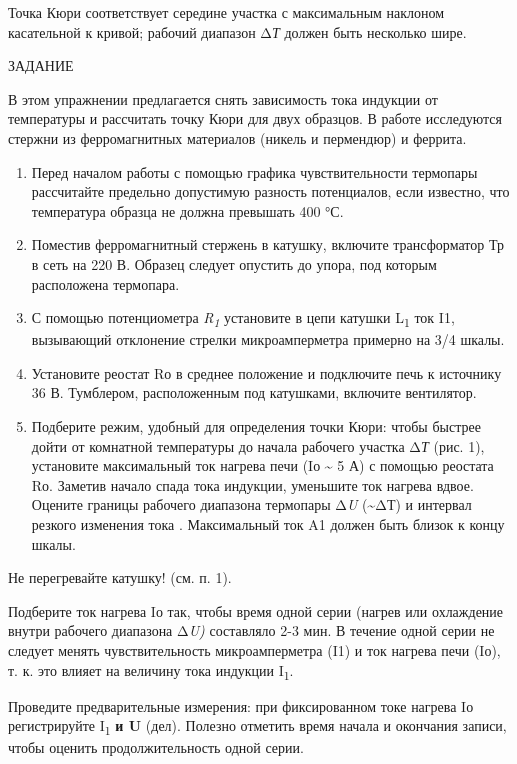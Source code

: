 \documentclass[]{article}
\begin{document}
Точка Кюри соответствует середине участка с максимальным накло­ном
касательной к кривой; рабочий диапазон Δ\emph{Т} должен быть несколь­ко
шире.

ЗАДАНИЕ

В этом упражнении предлагается снять зависимость тока индукции от
температуры и рассчитать точку Кюри для двух образцов. В работе
исследуются стержни из ферромагнитных материалов (никель и пермендюр) и
феррита.

\begin{enumerate}
\def\labelenumi{\arabic{enumi}.}
\item
  Перед началом работы с помощью графика чувствительности термо­пары
  рассчитайте предельно допустимую разность потенциалов, если известно,
  что температура образца не должна превышать 400 °С.
\item
  Поместив ферромагнитный стержень в катушку, включите трансфор­матор Тр
  в сеть на 220 В. Образец следует опустить до упора, под которым
  расположена термопара.
\item
  С помощью потенциометра \emph{R\textsubscript{1}} установите в цепи
  катушки L\textsubscript{1} ток I1, вызывающий отклонение стрелки
  микроамперметра примерно на 3/4 шкалы.
\item
  Установите реостат Rо в среднее положение и подключите печь к
  ис­точнику 36 В. Тумблером, расположенным под катушками, включите
  вентилятор.
\item
  Подберите режим, удобный для определения точки Кюри: чтобы быстрее
  дойти от комнатной температуры до начала рабочего участ­ка Δ\emph{Т}
  (рис. 1), установите максимальный ток нагрева печи (Iо
  \textasciitilde{} 5 А) с помощью реостата Rо. Заметив начало спада
  тока индукции, умень­шите ток нагрева вдвое. Оцените границы рабочего
  диапазона термопа­ры Δ\emph{U} (\textasciitilde{}ΔТ) и интервал
  резкого изменения тока . Максимальный ток A1 должен быть близок к
  концу шкалы.
\end{enumerate}

Не перегревайте катушку! (см. п. 1).

Подберите ток нагрева Iо так, чтобы время одной серии (нагрев или
охлаждение внутри рабочего диапазона Δ\emph{U)} составляло 2-3 мин. В
течение одной серии не следует менять чувствительность микроам­перметра
(I1) и ток нагрева печи (Iо), т. к. это влияет на величину тока индукции
I\textsubscript{1}.

Проведите предварительные измерения: при фиксированном токе нагрева Iо
регистрируйте I\textsubscript{1} \textbf{и U} (дел). Полезно отметить
время начала и окончания записи, чтобы оценить продолжительность одной
серии.
\end{document}
